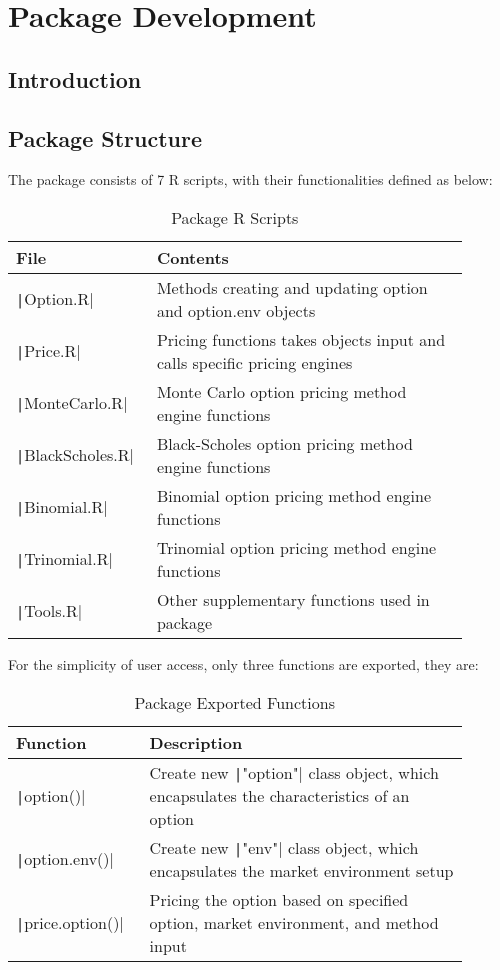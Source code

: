 \chapter{Package Development} \label{cpt:Pkg Dev}

\section{Introduction}

\section{Package Structure}

The package consists of 7 R scripts, with their functionalities defined as below:

\begin{table}[ht] \label{tab:pkg_scripts}
\begin{tabular}{p{0.25\linewidth} | p{0.65\linewidth}}
File                           & Contents                                                                 \\ \hline
\texttt|Option.R|       & Methods creating and updating option and option.env objects              \\
\texttt|Price.R|        & Pricing functions takes objects input and calls specific pricing engines \\
\texttt|MonteCarlo.R|   & Monte Carlo option pricing method engine functions                       \\
\texttt|BlackScholes.R| & Black-Scholes option pricing method engine functions                     \\
\texttt|Binomial.R|     & Binomial option pricing method engine functions                          \\
\texttt|Trinomial.R|    & Trinomial option pricing method engine functions                         \\
\texttt|Tools.R|        & Other supplementary functions used in package                           
\end{tabular}
\caption{Package R Scripts}
\end{table} 

For the simplicity of user access, only three functions are exported, they are:

\begin{table}[ht] \label{tab:pkg_functions}
\begin{tabular}{p{0.25\linewidth} | p{0.65\linewidth}}
Function                            & Description \\ \hline
\texttt|option()|            & Create new \texttt|"option"| class object, which encapsulates the characteristics of an option \\
\texttt|option.env()|        & Create new \texttt|"env"| class object, which encapsulates the market environment setup \\
\texttt|price.option()|      & Pricing the option based on specified option, market environment, and method input                       
\end{tabular}
\caption{Package Exported Functions}
\end{table}
